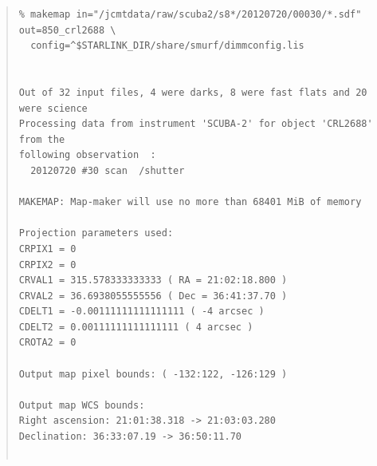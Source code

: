\documentclass[twoside,11pt]{article}
\renewcommand{\_}{\texttt{\symbol{95}}}
\newenvironment{myquote}{
   \color{MidnightBlue}\begin{quote}\begin{small}}{
   \end{small}\end{quote}
}
\renewenvironment{myquote}{
      \begin{quote}\begin{small}}{
      \end{small}\end{quote}
   }
\begin{document}
\begin{myquote}
\begin{verbatim}
% makemap in="/jcmtdata/raw/scuba2/s8*/20120720/00030/*.sdf" out=850_crl2688 \
  config=^$STARLINK_DIR/share/smurf/dimmconfig.lis


Out of 32 input files, 4 were darks, 8 were fast flats and 20 were science
Processing data from instrument 'SCUBA-2' for object 'CRL2688' from the
following observation  :
  20120720 #30 scan  /shutter

MAKEMAP: Map-maker will use no more than 68401 MiB of memory

Projection parameters used:
CRPIX1 = 0
CRPIX2 = 0
CRVAL1 = 315.578333333333 ( RA = 21:02:18.800 )
CRVAL2 = 36.6938055555556 ( Dec = 36:41:37.70 )
CDELT1 = -0.00111111111111111 ( -4 arcsec )
CDELT2 = 0.00111111111111111 ( 4 arcsec )
CROTA2 = 0

Output map pixel bounds: ( -132:122, -126:129 )

Output map WCS bounds:
Right ascension: 21:01:38.318 -> 21:03:03.280
Declination: 36:33:07.19 -> 36:50:11.70


\end{verbatim}
\end{myquote}
\end{document}
